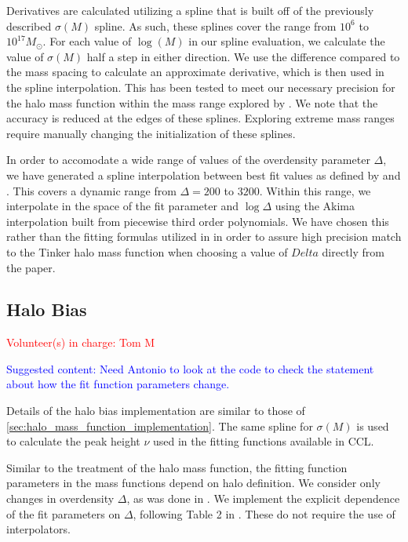 \documentclass[\docopts]{\docclass}
\newcommand{\vol}[1]{\textcolor{red}{Volunteer(s) in charge: #1}}
\newcommand{\cont}[1]{\textcolor{blue}{Suggested content: #1}}
\begin{document}
Derivatives are calculated utilizing a spline that is built off of the previously described $\sigma(M)$ spline. As such, these splines cover the range from $10^6$ to $10^{17} M_\odot$. For each value of $\log(M)$ in our spline evaluation, we calculate the value of $\sigma(M)$ half a step in either direction. We use the difference compared to the mass spacing to calculate an approximate derivative, which is then used in the spline interpolation. This has been tested to meet our necessary precision for the halo mass function within the mass range explored by \citet{Tinker2010}. We note that the accuracy is reduced at the edges of these splines. Exploring extreme mass ranges require manually changing the initialization of these splines.

In order to accomodate a wide range of values of the overdensity parameter $\Delta$, we have generated a spline interpolation between best fit values as defined by \citet{Tinker2008} and \citet{Tinker2010}. This covers a dynamic range from $\Delta=200$ to $3200$. Within this range, we interpolate in the space of the fit parameter and $\log\Delta$ using the Akima interpolation built from piecewise third order polynomials. We have chosen this rather than the fitting formulas utilized in \citet{Tinker2010} in order to assure high precision match to the Tinker halo mass function when choosing a value of $Delta$ directly from the paper. 

\subsection{Halo Bias}
\label{sec:halo_bias_implementation}
\vol{Tom M}

\cont{Need Antonio to look at the code to check the statement about how the fit function parameters change.}

Details of the halo bias implementation are similar to those of \autoref{sec:halo_mass_function_implementation}. The same spline for $\sigma(M)$ is used to calculate the peak height $\nu$ used in the fitting functions available in CCL.

Similar to the treatment of the halo mass function, the fitting function parameters in the mass functions depend on halo definition. We consider only changes in overdensity $\Delta$, as was done in \citet{Tinker2010}. We implement the explicit dependence of the fit parameters on $\Delta$, following Table 2 in \citet{Tinker2010}. These do not require the use of interpolators.
\end{document}

